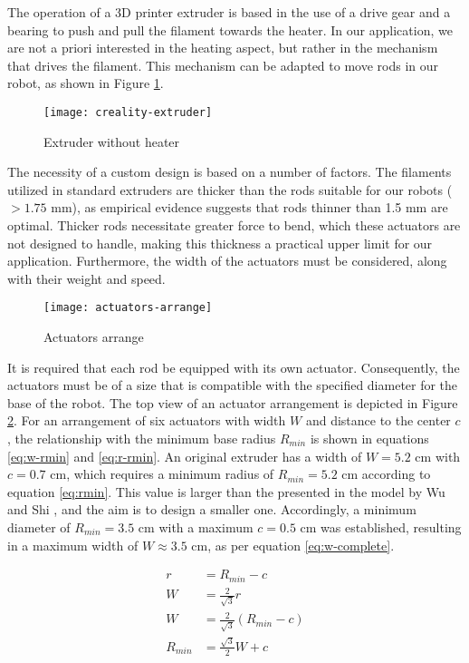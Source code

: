 The operation of a 3D printer extruder is based in the use of a drive gear and a bearing to push and pull the filament towards the heater. In our application, we are not a priori interested in the heating aspect, but rather in the mechanism that drives the filament. This mechanism can be adapted to move rods in our robot, as shown in Figure \ref{fig:extruder-wo-heater}.

\begin{figure}[H]
    \centering
    \texttt{[image: creality-extruder]}
    \caption{Extruder without heater}
    \label{fig:extruder-wo-heater}
\end{figure}

The necessity of a custom design is based on a number of factors. The filaments utilized in standard extruders are thicker than the rods suitable for our robots ($>1.75$ mm), as empirical evidence suggests that rods thinner than 1.5 mm are optimal. Thicker rods necessitate greater force to bend, which these actuators are not designed to handle, making this thickness a practical upper limit for our application. Furthermore, the width of the actuators must be considered, along with their weight and speed.

\begin{figure}[H]
    \centering
    \texttt{[image: actuators-arrange]}
    \caption{Actuators arrange}
    \label{fig:actuators-arrange}
\end{figure}

It is required that each rod be equipped with its own actuator. Consequently, the actuators must be of a size that is compatible with the specified diameter for the base of the robot. The top view of an actuator arrangement is depicted in Figure \ref{fig:actuators-arrange}. For an arrangement of six actuators with width $W$ and distance to the center $c$, the relationship with the minimum base radius $R_{min}$ is shown in equations \ref{eq:w-rmin} and \ref{eq:r-rmin}. An original extruder has a width of $W=5.2$ cm with $c=0.7$ cm, which requires a minimum radius of $R_{min}=5.2$ cm according to equation \ref{eq:rmin}. This value is larger than the presented in the model by Wu and Shi \cite{wu2022}, and the aim is to design a smaller one. Accordingly, a minimum diameter of $R_{min}=3.5$ cm with a maximum $c=0.5$ cm was established, resulting in a maximum width of $W\approx3.5$ cm, as per equation \ref{eq:w-complete}.


\begin{align}
    \label{eq:r-rmin}
    r&=R_{min}-c\\
    \label{eq:w-rmin}
    W&=\frac{2}{\sqrt{3}}r\\
    \label{eq:w-complete}
    W&=\frac{2}{\sqrt{3}}(R_{min}-c)\\
    \label{eq:rmin}
    R_{min}&=\frac{\sqrt{3}}{2}W+c
\end{align}


